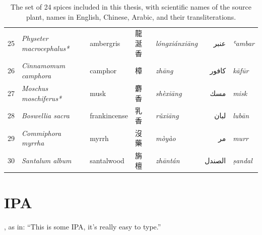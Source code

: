 \begin{table}[ht]
\begin{tabularx}{\textwidth}{@{}r>{\footnotesize}llll@{}rl@{}}
\midrule
 & & & & & & \\ \midrule
25          & \textit{Physeter macrocephalus*} & ambergris        & 龍涎香              & \textit{lóngxiánxiāng}   & عنبر            & \textit{ʿambar}          \\
26          & \textit{Cinnamomum camphora}     & camphor          & 樟                & \textit{zhāng}           & كافور           & \textit{kāfūr}           \\
27          & \textit{Moschus moschiferus*}    & musk             & 麝香               & \textit{shèxiāng}        & مسك             & \textit{misk}            \\
28          & \textit{Boswellia sacra}         & frankincense     & 乳香               & \textit{rǔxiāng}         & لبان            & \textit{lubān}           \\
29          & \textit{Commiphora myrrha}       & myrrh            & 沒藥               & \textit{mòyào}           & مر              & \textit{murr}            \\
30          & \textit{Santalum album}          & santalwood       & 旃檀               & \textit{zhāntán}         & الصندل          & \textit{ṣandal}          \\ 
\bottomrule
\end{tabularx}
\caption[An elaborate table]{The set of 24 spices included in this thesis, with scientific names of the source plant, names in English, Chinese, Arabic, and their transliterations.}
\label{table:set}
\end{table}

\setlength{\tabcolsep}{6pt} %

\section{IPA}

\textipa{[ðIsIzsAmaIpeI]},  as in: ``This is some IPA, it's really easy to type.''

